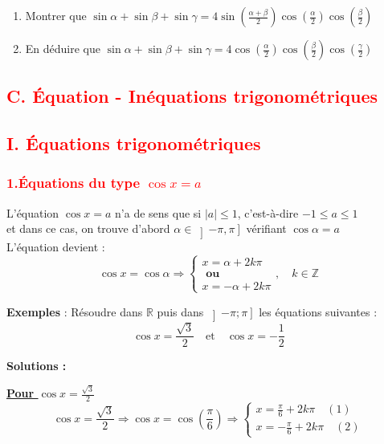 \documentclass[a4paper,12pt]{article}
\begin{document}
\begin{enumerate}
    \item Montrer que \( \sin \alpha + \sin \beta + \sin \gamma = 4 \sin\left(\frac{\alpha+\beta}{2}\right)\cos\left(\frac{\alpha}{2}\right)\cos\left(\frac{\beta}{2}\right) \)
    \item En déduire que \( \sin \alpha + \sin \beta + \sin \gamma = 4 \cos\left(\frac{\alpha}{2}\right)\cos\left(\frac{\beta}{2}\right)\cos\left(\frac{\gamma}{2}\right) \)
\end{enumerate}


\subsection*{\textcolor{red}{C. Équation - Inéquations trigonométriques}}

\subsection*{\textcolor{red}{I. Équations trigonométriques}}

\subsubsection*{\textcolor{red}{1.Équations du type $\cos x = a$}}

L’équation $\cos x = a$ n’a de sens que si $|a| \leq 1$, c’est-à-dire $-1 \leq a \leq 1$\\
et dans ce cas, on trouve d’abord $ \alpha \in \left]-\pi, \pi\right] $ vérifiant $\cos \alpha = a$\\
L’équation devient :\\

\[
    \cos x = \cos \alpha \Rightarrow
    \left\{
    \begin{array}{l}
        x = \alpha + 2k\pi \\
        \textbf{ ou }      \\
        x = -\alpha + 2k\pi
    \end{array}
    \right., \quad k \in \mathbb{Z}
\]

\textbf{Exemples} : Résoudre dans $\mathbb{R}$ puis dans $ \left] -\pi ; \pi \right] $ les équations suivantes :\\

\[
    \cos x = \frac{\sqrt{3}}{2} \quad \text{et} \quad \cos x = -\frac{1}{2}
\]

\textbf{Solutions :}

\textbf{\underline{Pour $\cos x = \frac{\sqrt{3}}{2}$}}
\[
    \cos x = \frac{\sqrt{3}}{2} \Rightarrow \cos x = \cos\left(\frac{\pi}{6}\right)
    \Rightarrow
    \begin{cases}
        x = \frac{\pi}{6} + 2k\pi \quad(1) \\
        x = -\frac{\pi}{6} + 2k\pi \quad(2)
    \end{cases}
\]
\end{document}
